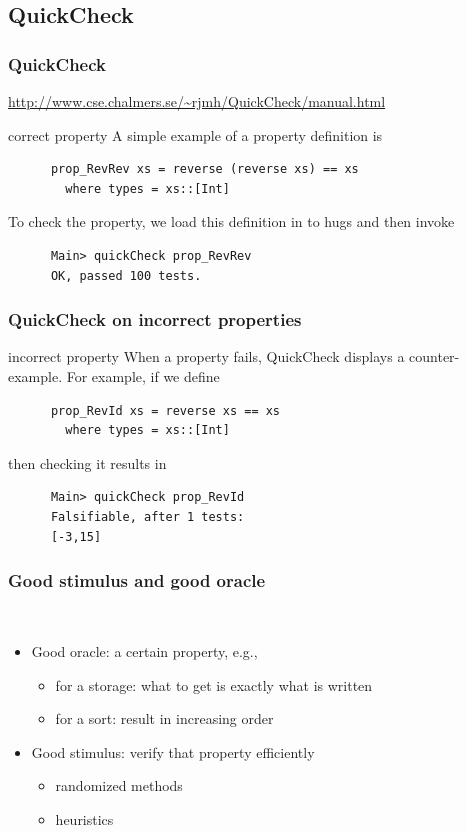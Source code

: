 \documentclass[lualatex]{beamer}
\begin{document}
\subsection{QuickCheck}

\begin{frame}[fragile]
  \frametitle{QuickCheck}

  \url{http://www.cse.chalmers.se/~rjmh/QuickCheck/manual.html}

  \begin{block}{correct property}
    A simple example of a property definition is
    \begin{verbatim}
      prop_RevRev xs = reverse (reverse xs) == xs
        where types = xs::[Int]
    \end{verbatim}
    To check the property, we load this definition in to hugs and then invoke
    \begin{verbatim}
      Main> quickCheck prop_RevRev
      OK, passed 100 tests.
    \end{verbatim}
  \end{block}
\end{frame}

\begin{frame}[fragile]
  \frametitle{QuickCheck on incorrect properties}

  \begin{block}{incorrect property}
    When a property fails, QuickCheck displays a counter-example.
    For example, if we define
    \begin{verbatim}
      prop_RevId xs = reverse xs == xs
        where types = xs::[Int]
    \end{verbatim}
    then checking it results in
    \begin{verbatim}
      Main> quickCheck prop_RevId
      Falsifiable, after 1 tests:
      [-3,15]
    \end{verbatim}
  \end{block}
\end{frame}

\begin{frame}
  \frametitle{Good stimulus and good oracle}

  \begin{block}{~}
    \begin{itemize}
    \item Good oracle: a certain property, e.g.,
      \begin{itemize}
      \item for a storage: what to get is exactly what is written
      \item for a sort: result in increasing order
      \end{itemize}
    \item Good stimulus: verify that property efficiently
      \begin{itemize}
      \item randomized methods
      \item heuristics
      \end{itemize}
    \end{itemize}
  \end{block}
\end{frame}
\end{document}

